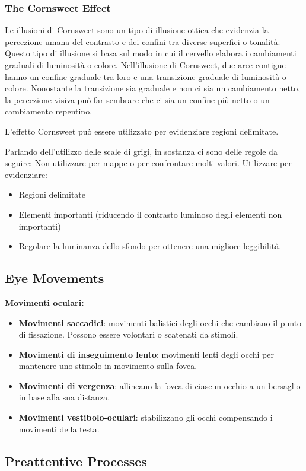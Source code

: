 \subsubsection{The Cornsweet Effect}
Le illusioni di Cornsweet sono un tipo di illusione ottica che evidenzia la percezione umana del contrasto e dei confini tra diverse superfici o tonalità. Questo tipo di illusione si basa sul modo in cui il cervello elabora i cambiamenti graduali di luminosità o colore.
Nell'illusione di Cornsweet, due aree contigue hanno un confine graduale tra loro e una transizione graduale di luminosità o colore. Nonostante la transizione sia graduale e non ci sia un cambiamento netto, la percezione visiva può far 
sembrare che ci sia un confine più netto o un cambiamento repentino.

L'effetto Cornsweet può essere utilizzato per evidenziare regioni delimitate.

Parlando dell'utilizzo delle scale di grigi, in sostanza ci sono delle regole da seguire:
Non utilizzare per mappe o per confrontare molti valori.
Utilizzare per evidenziare:
\begin{itemize}
    \item Regioni delimitate
    \item Elementi importanti (riducendo il contrasto luminoso degli elementi non importanti)
    \item Regolare la luminanza dello sfondo per ottenere una migliore leggibilità.
\end{itemize}
\subsection{Eye Movements}
\textbf{Movimenti oculari:}
\begin{itemize}
    \item \textbf{Movimenti saccadici}: movimenti balistici degli occhi che cambiano il punto di fissazione. Possono essere volontari o scatenati da stimoli.
    \item \textbf{Movimenti di inseguimento lento}: movimenti lenti degli occhi per mantenere uno stimolo in movimento sulla fovea.
    \item \textbf{Movimenti di vergenza}: allineano la fovea di ciascun occhio a un bersaglio in base alla sua distanza.
    \item \textbf{Movimenti vestibolo-oculari}: stabilizzano gli occhi compensando i movimenti della testa.

\end{itemize}
\subsection[short]{Preattentive Processes}

